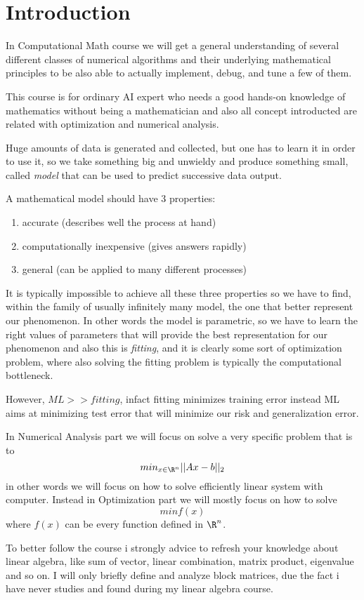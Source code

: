\chapter{Introduction}
In Computational Math course we will get a general understanding of several different classes of
numerical algorithms and their underlying mathematical principles to be also able to actually
implement, debug, and tune a few of them.

This course is for ordinary AI expert who needs a good hands-on knowledge of mathematics without being a mathematician
and also all concept introducted are related with optimization and numerical analysis.

Huge amounts of data is generated and collected, but one has to learn it in order to use it, so we
take something big and unwieldy and produce something small, called \emph{model} that can be used
to predict successive data output.

A mathematical model should have 3 properties:
\begin{enumerate}
    \item accurate (describes well the process at hand)
    \item computationally inexpensive (gives answers rapidly)
    \item general (can be applied to many different processes)
\end{enumerate}
It is typically impossible to achieve all these three properties so we have to find, within the family of usually
infinitely many model, the one that better represent our phenomenon.\newline
In other words the model is parametric, so we have to learn the right values of parameters that will provide
the best representation for our phenomenon and also this is \emph{fitting}, and it is clearly
some sort of optimization problem, where also solving the fitting problem is typically the computational bottleneck.

However, $ML >> fitting$, infact fitting minimizes training error instead ML aims at minimizing test error 
that will minimize our risk and generalization error.

In Numerical Analysis part we will focus on solve a very specific problem that is to 
\[ min _{x \in \R^n} ||Ax - b||_2 \]
in other words we will focus on how to solve efficiently linear system with computer.\newline
Instead in Optimization part we will mostly focus on how to solve 
\[ min f(x) \]
where $f(x)$ can be every function defined in $\R ^n$.

To better follow the course i strongly advice to refresh your knowledge about linear algebra, like sum of vector,
linear combination, matrix product, eigenvalue and so on.\newline
I will only briefly define and analyze block matrices, due the fact i have never studies and found during my
linear algebra course.




